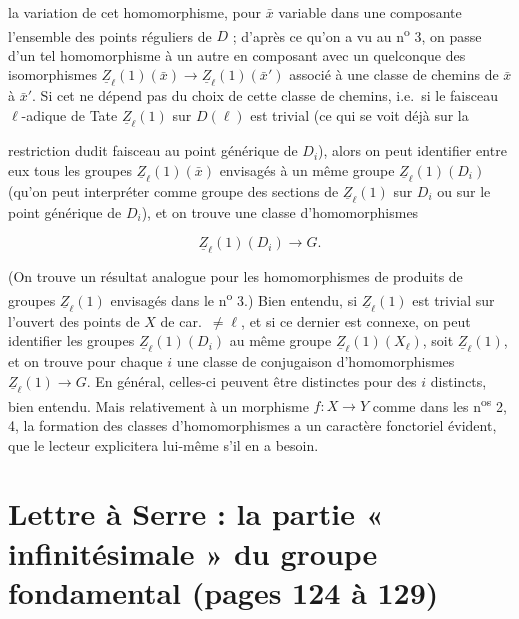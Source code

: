 \documentclass[11pt,a4paper]{article}
\begin{document}
  la variation de cet homomorphisme, pour $\bar{x}$
variable dans une composante   l'ensemble des
points réguliers de $D$  ; d'après ce qu'on a vu au
n\textsuperscript{o} 3, on passe d'un tel homomorphisme à un autre en composant
avec un quelconque des isomorphismes $\underline{Z}_{\ell}(1)(\bar{x}) \to
\underline{Z}_{\ell}(1)(\bar{x}')$ associé à une classe de chemins de $\bar{x}$
à $\bar{x}'$. Si cet  ne dépend pas du choix de cette classe de chemins, i.e.\ si
 le faisceau $\ell$-adique de Tate
$\underline{Z}_{\ell}(1)$ sur $D(\ell)$ est trivial (ce qui se voit déjà sur la


restriction dudit faisceau au  point générique de
$D_{i}$), alors on peut identifier entre eux tous les groupes
$\underline{Z}_{\ell}(1)(\bar{x})$ envisagés à un même groupe
$\underline{Z}_{\ell}(1)(D_{i})$ (qu'on peut interpréter comme groupe des
sections de $\underline{Z}_{\ell}(1)$ sur $D_{i}$ ou sur le point générique de
$D_{i}$), et on trouve une classe  
d'homomorphismes

\[ \underline{Z}_{\ell}(1)(D_{i}) \to G. \]

(On trouve un résultat analogue pour les homomorphismes de produits de groupes
$\underline{Z}_{\ell}(1)$ envisagés dans le n\textsuperscript{o} 3.) Bien
entendu, si $\underline{Z}_{\ell}(1)$ est trivial sur l'ouvert 
des points de $X$  de car.\ $\neq \ell$, et si ce dernier est
connexe, on peut identifier les groupes $\underline{Z}_{\ell}(1)(D_{i})$ au
même groupe $\underline{Z}_{\ell}(1)(X_{\ell})$,  soit
$\underline{Z}_{\ell}(1)$, et on trouve  pour
chaque $i$ une  classe de conjugaison d'homomorphismes
$\underline{Z}_{\ell}(1) \to G$. En général, celles-ci  peuvent
être distinctes pour des $i$ distincts, bien entendu. Mais relativement à un
morphisme $f : X \to Y$ comme dans les n\textsuperscript{os} 2, 4, la formation
des classes   d'homomorphismes
 a un caractère fonctoriel évident, que le lecteur explicitera
lui-même s'il en a besoin.

\section*{Lettre à Serre : la partie « infinitésimale » du groupe fondamental (pages 124 à 129)}
\end{document}

